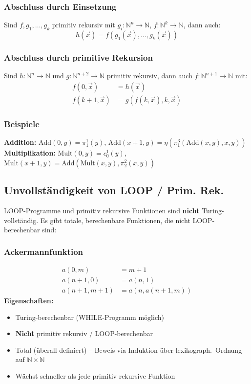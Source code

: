 \subsubsection{Abschluss durch Einsetzung}
Sind $f, g_1, \ldots, g_k$ primitiv rekursiv mit $g_i : \mathbb{N}^n \to \mathbb{N}$, $f : \mathbb{N}^k \to \mathbb{N}$, dann auch:
\[
    h(\vec{x}) = f(g_1(\vec{x}), \ldots, g_k(\vec{x}))
\]

\subsubsection{Abschluss durch primitive Rekursion}
Sind $h : \mathbb{N}^n \to \mathbb{N}$ und $g : \mathbb{N}^{n+2} \to \mathbb{N}$ primitiv rekursiv, dann auch $f : \mathbb{N}^{n+1} \to \mathbb{N}$ mit:
\begin{align*}
    f(0, \vec{x}) &= h(\vec{x}) \\
    f(k+1, \vec{x}) &= g(f(k, \vec{x}), k, \vec{x})
\end{align*}

\subsubsection{Beispiele}
\textbf{Addition:}
$\text{Add}(0,y) = \pi_1^1(y)$, \quad $\text{Add}(x+1,y) = \eta(\pi_1^3(\text{Add}(x,y),x,y))$\\
\textbf{Multiplikation:}
$\text{Mult}(0,y) = c_0^1(y)$, \quad $\text{Mult}(x+1,y) = \text{Add}(\text{Mult}(x,y), \pi_2^2(x,y))$

\subsection{Unvollständigkeit von LOOP / Prim. Rek.}
LOOP-Programme und primitiv rekursive Funktionen sind \textbf{nicht} Turing-vollständig. Es gibt totale, berechenbare Funktionen, die nicht LOOP-berechenbar sind:

\subsubsection{Ackermannfunktion}
\begin{align*}
    a(0, m) &= m + 1 \\
    a(n+1, 0) &= a(n, 1) \\
    a(n+1, m+1) &= a(n, a(n+1, m))
\end{align*}
\textbf{Eigenschaften:}
\begin{itemize}
    \item Turing-berechenbar (WHILE-Programm möglich)
    \item \textbf{Nicht} primitiv rekursiv / LOOP-berechenbar
    \item Total (überall definiert) -- Beweis via Induktion über lexikograph.\ Ordnung auf $\mathbb{N} \times \mathbb{N}$
    \item Wächst schneller als jede primitiv rekursive Funktion
\end{itemize}

